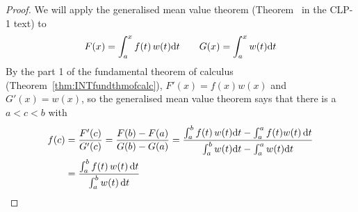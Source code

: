 \begin{proof}
We will apply the generalised mean value theorem (Theorem~ in the CLP-1 text) to
\begin{equation*}
F(x) = \int_a^x f(t)\,w(t)\mathrm{d}t\qquad
G(x) = \int_a^x w(t)\mathrm{d}t
\end{equation*}
By the part 1 of the fundamental theorem of calculus 
(Theorem~\ref{thm:INTfundthmofcalc}),
$F'(x)=f(x)w(x)$ and $G'(x)=w(x)$, so the generalised mean value theorem 
says that there is a $a<c<b$ with
\begin{align*}
f(c) &= \frac{F'(c)}{G'(c)} = \frac{F(b)-F(a)}{G(b)-G(a)}
=\frac{\int_a^b f(t)\,w(t)\mathrm{d}t-\int_a^a f(t)w(t)\,\mathrm{d}t}
  {\int_a^b w(t)\mathrm{d}t-\int_a^a w(t)\mathrm{d}t}
\\
&=\frac{\int_a^b f(t)\,w(t)\,\mathrm{d}t}{\int_a^b w(t)\,\mathrm{d}t}
\end{align*}
\end{proof}

